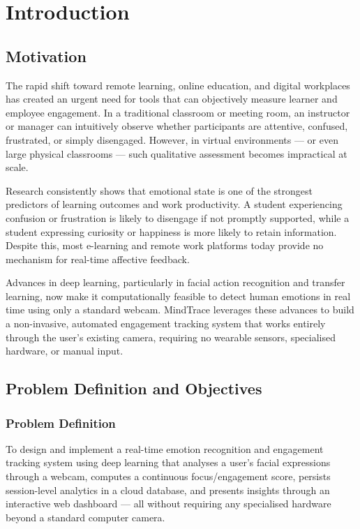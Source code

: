 \chapter{Introduction}

\section{Motivation}

The rapid shift toward remote learning, online education, and digital workplaces
has created an urgent need for tools that can objectively measure learner and
employee engagement. In a traditional classroom or meeting room, an instructor or
manager can intuitively observe whether participants are attentive, confused,
frustrated, or simply disengaged. However, in virtual environments — or even
large physical classrooms — such qualitative assessment becomes impractical at
scale.

Research consistently shows that emotional state is one of the strongest
predictors of learning outcomes and work productivity. A student experiencing
confusion or frustration is likely to disengage if not promptly supported,
while a student expressing curiosity or happiness is more likely to retain
information. Despite this, most e-learning and remote work platforms today
provide no mechanism for real-time affective feedback.

Advances in deep learning, particularly in facial action recognition and transfer
learning, now make it computationally feasible to detect human emotions in real
time using only a standard webcam. MindTrace leverages these advances to build a
non-invasive, automated engagement tracking system that works entirely through the
user's existing camera, requiring no wearable sensors, specialised hardware, or
manual input.

\section{Problem Definition and Objectives}

\subsection{Problem Definition}

To design and implement a real-time emotion recognition and engagement tracking
system using deep learning that analyses a user's facial expressions through a
webcam, computes a continuous focus/engagement score, persists session-level
analytics in a cloud database, and presents insights through an interactive web
dashboard — all without requiring any specialised hardware beyond a standard
computer camera.

